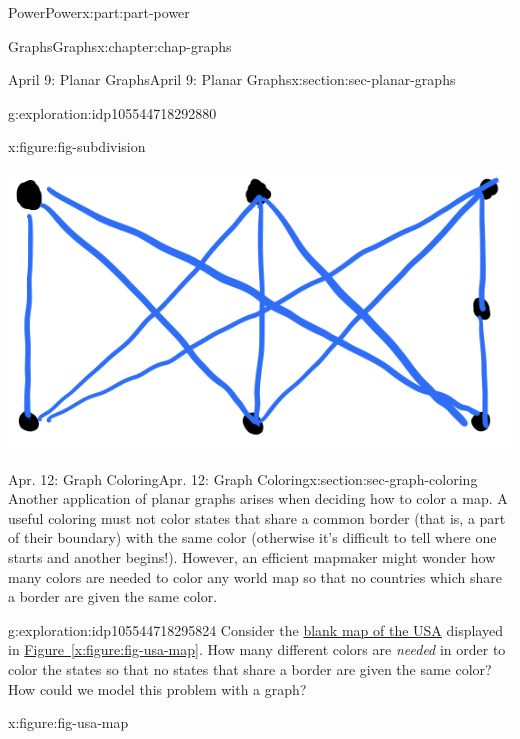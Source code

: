 \documentclass[oneside,10pt,]{book}
\newcommand{\xreffont}{\relax}
\numberwithin{equation}{section}
\begin{document}
\begin{partptx}{Power}{}{Power}{}{}{x:part:part-power}
\begin{chapterptx}{Graphs}{}{Graphs}{}{}{x:chapter:chap-graphs}
\begin{sectionptx}{April 9: Planar Graphs}{}{April 9: Planar Graphs}{}{}{x:section:sec-planar-graphs}
\begin{exploration}{}{g:exploration:idp105544718292880}
\begin{figureptx}{}{x:figure:fig-subdivision}{}
\begin{image}{0.25}{0.5}{0.25}%
\includegraphics[width=\linewidth]{./images/subdivision.png}
\end{image}%
\tcblower
\end{figureptx}%
\end{exploration}%
\end{sectionptx}
%
%
\typeout{************************************************}
\typeout{************************************************}
%
\begin{sectionptx}{Apr. 12: Graph Coloring}{}{Apr. 12: Graph Coloring}{}{}{x:section:sec-graph-coloring}
Another application of planar graphs arises when deciding how to color a map. A useful coloring must not color states that share a common border (that is, a part of their boundary) with the same color (otherwise it’s difficult to tell where one starts and another begins!). However, an efficient mapmaker might wonder how many colors are needed to color any world map so that no countries which share a border are given the same color.%
\begin{exploration}{}{g:exploration:idp105544718295824}%
Consider the \href{./usa_map.pdf}{blank map of the USA}\footnotemark{} displayed in \hyperref[x:figure:fig-usa-map]{Figure~{\xreffont\ref{x:figure:fig-usa-map}}}. How many different colors are \emph{needed} in order to color the states so that no states that share a border are given the same color? How could we model this problem with a graph?%
\begin{figureptx}{}{x:figure:fig-usa-map}{}%
\begin{image}{0.175}{0.65}{0.175}%

\end{image}
\end{figureptx}
\end{exploration}
\end{sectionptx}
\end{chapterptx}
\end{partptx}
\end{document}

